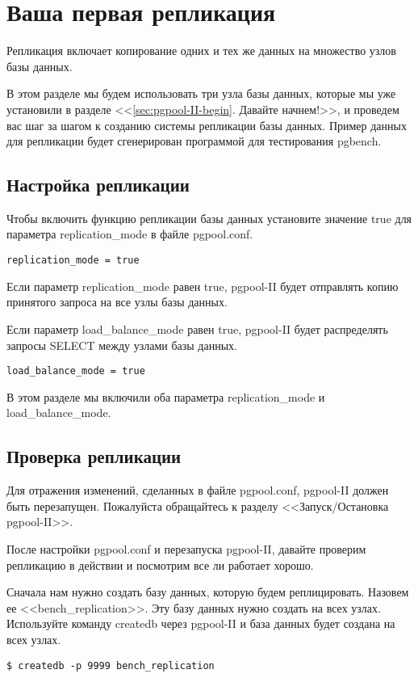 \section{Ваша первая репликация}
\label{sec:pgpool-II-replica}
Репликация включает копирование одних и тех же данных на множество узлов базы данных.

В этом разделе мы будем использовать три узла базы данных, которые мы уже установили в разделе 
<<\ref{sec:pgpool-II-begin}. Давайте начнем!>>, и проведем вас шаг за шагом к созданию системы репликации базы данных. 
Пример данных для репликации будет сгенерирован программой для тестирования pgbench.

\subsection{Настройка репликации}
Чтобы включить функцию репликации базы данных установите значение true для параметра replication\_mode в файле pgpool.conf.
\begin{verbatim}
replication_mode = true
\end{verbatim}

Если параметр replication\_mode равен true, pgpool-II будет отправлять копию принятого запроса на все узлы базы данных.

Если параметр load\_balance\_mode равен true, pgpool-II будет распределять запросы SELECT между узлами базы данных.
\begin{verbatim}
load_balance_mode = true
\end{verbatim}

В этом разделе мы включили оба параметра replication\_mode и load\_balance\_mode.

\subsection{Проверка репликации}
Для отражения изменений, сделанных в файле pgpool.conf, pgpool-II должен быть перезапущен. 
Пожалуйста обращайтесь к разделу <<Запуск/Остановка pgpool-II>>.

После настройки pgpool.conf и перезапуска pgpool-II, давайте проверим репликацию в действии 
и посмотрим все ли работает хорошо.

Сначала нам нужно создать базу данных, которую будем реплицировать. Назовем ее <<bench\_replication>>. 
Эту базу данных нужно создать на всех узлах. Используйте команду createdb через pgpool-II и база 
данных будет создана на всех узлах.
\begin{verbatim}
$ createdb -p 9999 bench_replication
\end{verbatim}

